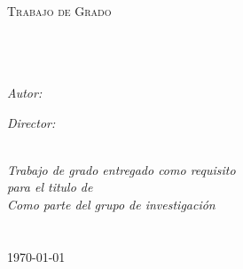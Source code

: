 \documentclass[
11pt, %
oneside, %
spanish, %
singlespacing, %
parskip, %
headsepline, %
]{MastersDoctoralThesis} %
\author{Carlos \textsc{Buelvas Montes}} %
\begin{document}
\frontmatter %

\pagestyle{plain} %


\begin{titlepage}
\begin{center}

\textsc{\LARGE \univname}\\[1.5cm] %
\textsc{\Large Trabajo de Grado}\\[0.5cm] %

\HRule \\[0.4cm] %
{\huge \bfseries \ttitle}\\[0.4cm] %
\HRule \\[1.5cm] %
 
\begin{minipage}{0.4\textwidth}
\begin{flushleft} \large
\emph{Autor:}\\
\authorname
\end{flushleft}
\end{minipage}
\begin{minipage}{0.4\textwidth}
\begin{flushright} \large
\emph{Director:} \\
\supname
\end{flushright}
\end{minipage}\\[3cm]
 
\large \textit{Trabajo de grado entregado como requisito\\ para el titulo de  \degreename}\\[0.3cm] %
\textit{Como parte del grupo de investigación}\\[0.4cm]
\groupname\\\facname\\[2cm] %
 
{\large \today}\\[4cm] %
 
\vfill
\end{center}
\end{titlepage}
\end{document}
